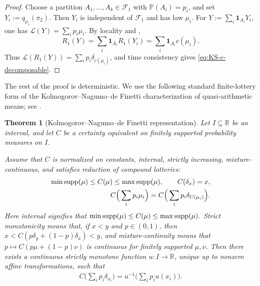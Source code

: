 \documentclass[a4paper]{amsart}
\newtheorem{theorem}{Theorem}[section]
\theoremstyle{definition}
\newcommand{\R}{\mathbb{R}}
\newcommand{\F}{\mathcal{F}}
\newcommand{\supp}{\textup{supp}}
\newcommand{\law}{\mathcal{L}}
\renewcommand{\subset}{\subseteq}
\renewcommand{\P}{\mathbb{P}}
\begin{document}
\begin{proof}
Choose a partition \(A_1,\dots,A_k\in\F_1\) with \(\P(A_i)=p_i\), and set
\(Y_i:=q_{\mu_i}(\pi_2)\). Then \(Y_i\) is independent of \(\F_1\) and has
law \(\mu_i\). For \(Y:=\sum_i\mathbf 1_{A_i}Y_i\), one has
\(\law(Y)=\sum_i p_i\mu_i\). By locality and
,
\[
R_1(Y)
=
\sum_i\mathbf 1_{A_i}R_1(Y_i)
=
\sum_i\mathbf 1_{A_i}c(\mu_i).
\]
Thus \(\law(R_1(Y))=\sum_i p_i\delta_{c(\mu_i)}\), and time consistency gives
\eqref{eq:KS-c-decomposable}.
\end{proof}

The rest of the proof is deterministic. We use the following standard
finite-lottery form of the Kolmogorov--Nagumo--de Finetti \cite{Kolmogorov1930,Nagumo1930,deFinetti1931} characterization of
quasi-arithmetic means; see
 \cite[Chapter V]{Aczel1966}.

\begin{theorem}[Kolmogorov--Nagumo--de Finetti representation]
\label{thm:finite-vNM-deFinetti}
Let \(I\subset\R\) be an interval, and let \(C\) be a certainty equivalent on
finitely supported probability measures on \(I\). 


Assume that \(C\) is normalized on constants,
internal, strictly increasing, mixture-continuous, and satisfies reduction of
compound lotteries:
\begin{align}
\min\supp(\mu)\le C(\mu)\le \max\supp(\mu),
\qquad
C(\delta_x)=x,
\label{eq:KNdF-internality}
\\
C\Big(\sum_i p_i\mu_i\Big)
=
C\Big(\sum_i p_i\delta_{C(\mu_i)}\Big).
\label{eq:KNdF-reduction}
\end{align}
Here internal signifies that
\(
\min\supp(\mu)\le C(\mu)\le \max\supp(\mu).
\)
Strict monotonicity means that, if \(x<y\) and \(p\in(0,1)\), then
\(x<C(p\delta_y+(1-p)\delta_x)<y\), and mixture-continuity means that
\(p\mapsto C(p\mu+(1-p)\nu)\) is continuous for finitely supported
\(\mu,\nu\). Then there exists a continuous strictly monotone function
\(u:I\to\R\), unique up to nonzero affine transformations, such that
\begin{align}
C\Big(\sum_i p_i\delta_{x_i}\Big)
=
u^{-1}\Big(\sum_i p_i u(x_i)\Big).
\label{eq:KNdF-representation}
\end{align}
\end{theorem}
\end{document}
